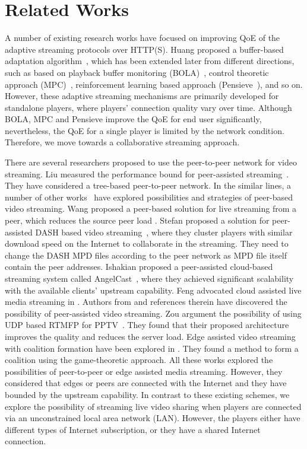 \section{Related Works}
A number of existing research works have focused on improving QoE of the adaptive streaming protocols over HTTP(S). Huang \etal proposed a buffer-based adaptation algorithm~\cite{buffer-based-sigcomm-2014}, which has been extended later from different directions, such as based on playback buffer monitoring (BOLA)~\cite{bola2-acm-mmsys2018}, control theoretic approach (MPC)~\cite{MPC-SIGCOMM-2015}, reinforcement learning based approach (Pensieve~\cite{Pensieve}), and so on. However, these adaptive streaming mechanisms are primarily developed for standalone players, where players' connection quality vary over time. Although BOLA, MPC and Pensieve improve the QoE for end user significantly, nevertheless, the QoE for a single player is limited by the network condition. Therefore, we move towards a collaborative streaming approach. 

There are several researchers proposed to use the peer-to-peer network for video streaming. Liu \etal measured the performance bound for peer-assisted streaming~\cite{Liu-sigmetrics-2008}. They have considered a tree-based peer-to-peer network. In the similar lines, a number of other works~\cite{Wang:ACMmm-2011,P2PHttp-2012,P2P-incentive-2010,TNET-Coop-2015} have explored possibilities and strategies of peer-based video streaming. Wang \etal proposed a peer-based solution for live streaming from a peer, which reduces the source peer load \cite{Wang:ACMmm-2011}. Stefan \etal proposed a solution for peer-assisted DASH based video streaming~\cite{P2PHttp-2012}, where they cluster players with similar download speed on the Internet to collaborate in the streaming. They need to change the DASH MPD files according to the peer network as MPD file itself contain the peer addresses. Ishakian \etal proposed a peer-assisted cloud-based streaming system called AngelCast~\cite{ISHAKIAN201714}, where they achieved significant scalability with the available clients' upstream capability.
Feng \etal advocated cloud assisted live media streaming in \cite{TNET-Migration-2016}. Authors from \cite{PeerAss-RTMFP-2018, EdgeNode-GameTheory-Globecomm-2018, Collaborative-P2P-WCNC-2018} and references therein have discovered the possibility of peer-assisted video streaming. Zou \etal argument the possibility of using UDP based RTMFP for PPTV~\cite{PeerAss-RTMFP-2018}. They found that their proposed architecture improves the quality and reduces the server load. Edge assisted video streaming with coalition formation have been explored in \cite{EdgeNode-GameTheory-Globecomm-2018}. They found a method to form a coalition using the game-theoretic approach. All these works explored the possibilities of peer-to-peer or edge assisted media streaming. However, they considered that edges or peers are connected with the Internet and they have bounded by the upstream capability. In contrast to these existing schemes, we explore the possibility of streaming live video sharing when players are connected via an unconstrained local area network (LAN). However, the players either have different types of Internet subscription, or they have a shared Internet connection.


